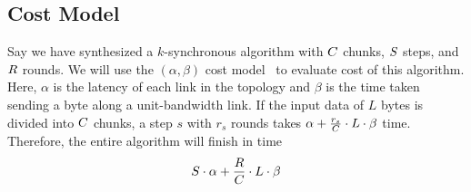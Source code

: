 \subsection{Cost Model}
\label{sec:costmodel}
Say we have synthesized a $k$-synchronous algorithm with $C$ chunks, $S$ steps, and $R$ rounds.
We will use the $(\alpha, \beta)$ cost model~\cite{hockney1994communication} to evaluate cost of this algorithm.
Here, $\alpha$ is the latency of each link in the topology and $\beta$ is the time taken sending a byte along a unit-bandwidth link.
If the input data of $L$ bytes is divided into $C$ chunks, a step $s$ with $r_s$ rounds takes $\alpha + \frac{r_s}{C}\cdot L \cdot \beta$ time. Therefore, the entire algorithm will finish in time
$$ S \cdot \alpha + \frac{R}{C} \cdot L \cdot \beta $$

